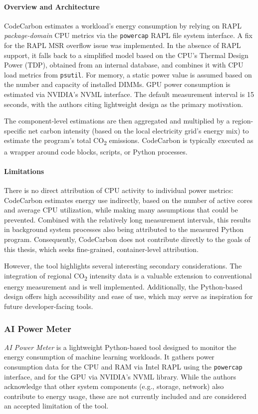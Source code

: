 \paragraph{Overview and Architecture}
CodeCarbon estimates a workload’s energy consumption by relying on RAPL \textit{package-domain} CPU metrics via the \texttt{powercap} RAPL file system interface. A fix for the RAPL MSR overflow issue was implemented\parencite{codecarbon_issue_322}. In the absence of RAPL support, it falls back to a simplified model based on the CPU’s Thermal Design Power (TDP), obtained from an internal database, and combines it with CPU load metrics from \texttt{psutil}. For memory, a static power value is assumed based on the number and capacity of installed DIMMs. GPU power consumption is estimated via NVIDIA’s NVML interface. The default measurement interval is 15 seconds, with the authors citing lightweight design as the primary motivation.

The component-level estimations are then aggregated and multiplied by a region-specific net carbon intensity (based on the local electricity grid’s energy mix) to estimate the program’s total CO\textsubscript{2} emissions. CodeCarbon is typically executed as a wrapper around code blocks, scripts, or Python processes.

\paragraph{Limitations}
There is no direct attribution of CPU activity to individual power metrics: CodeCarbon estimates energy use indirectly, based on the number of active cores and average CPU utilization, while making many assumptions that could be prevented. Combined with the relatively long measurement intervals, this results in background system processes also being attributed to the measured Python program. Consequently, CodeCarbon does not contribute directly to the goals of this thesis, which seeks fine-grained, container-level attribution.

However, the tool highlights several interesting secondary considerations. The integration of regional CO\textsubscript{2} intensity data is a valuable extension to conventional energy measurement and is well implemented. Additionally, the Python-based design offers high accessibility and ease of use, which may serve as inspiration for future developer-facing tools.

\subsubsection{AI Power Meter}
\textit{AI Power Meter}\parencite{aipowermeter} is a lightweight Python-based tool designed to monitor the energy consumption of machine learning workloads. It gathers power consumption data for the CPU and RAM via Intel RAPL using the \texttt{powercap} interface, and for the GPU via NVIDIA’s NVML library. While the authors acknowledge that other system components (e.g., storage, network) also contribute to energy usage, these are not currently included and are considered an accepted limitation of the tool.

